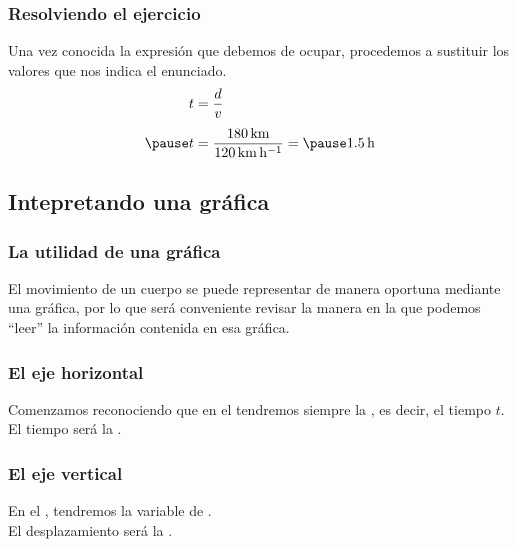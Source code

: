 \documentclass[14pt]{beamer}
\begin{document}
\begin{frame}
\frametitle{Resolviendo el ejercicio}
 Una vez conocida la expresión que debemos de ocupar, procedemos a sustituir los valores que nos indica el enunciado.
\pause
\begin{eqnarray*}
\begin{aligned}
t &= \dfrac{d}{v} \\[0.35em] \pause
t &= \dfrac{\SI{180}{\kilo\meter}}{\SI{120}{\kilo\meter\per\hour}} = \pause \SI{1.5}{\hour}
\end{aligned}
\end{eqnarray*}
\end{frame}

\subsection{Intepretando una gráfica}

\begin{frame}
\frametitle{La utilidad de una gráfica}
El movimiento de un cuerpo se puede representar de manera oportuna mediante una gráfica, \pause por lo que será conveniente revisar la manera en la que podemos \enquote{leer} la información contenida en esa gráfica.
\end{frame}
\begin{frame}
\frametitle{El eje horizontal}
Comenzamos reconociendo que en el  tendremos siempre la , es decir, el tiempo $t$.
\\
\bigskip
\pause
El tiempo será la .
\end{frame}
\begin{frame}
\frametitle{El eje vertical}
En el , tendremos la variable de .
\\
\bigskip
\pause
El desplazamiento será la .
\end{frame}
\end{document}
